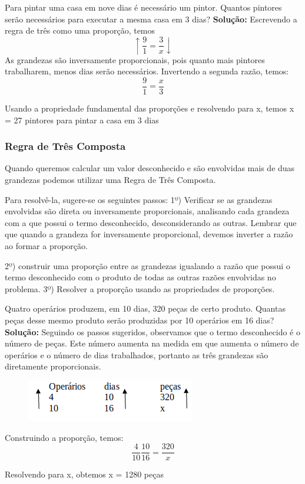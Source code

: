 \begin{texemplo}

	Para pintar uma casa em nove dias é necessário um pintor. Quantos pintores serão necessários para executar a mesma casa em 3 dias?
	\textbf{Solução:} Escrevendo a regra de três como uma proporção, temos 
	$$\uparrow \dfrac{9}{1} = \dfrac{3}{x} \downarrow$$
	As grandezas são inversamente proporcionais, pois quanto mais pintores trabalharem, menos dias serão necessários. Invertendo a segunda razão, temos:
	$$\dfrac{9}{1} = \dfrac{x}{3}$$ 
 
	Usando a propriedade fundamental das proporções e resolvendo para x, temos x = 27 pintores para pintar a casa em 3 dias \qedsymbol{}

\end{texemplo}

\subsubsection{Regra de Três Composta}
	Quando queremos calcular um valor desconhecido e são envolvidas mais de duas grandezas podemos utilizar uma Regra de Três Composta. 

	Para resolvê-la, sugere-se os seguintes passos:
	1º) Verificar se as grandezas envolvidas são direta ou inversamente proporcionais, analisando cada grandeza com a que possui o termo desconhecido, desconsiderando as outras. Lembrar que que quando a grandeza for inversamente proporcional, devemos inverter a razão ao formar a proporção.

	2º) construir uma proporção entre as grandezas igualando a razão que possui o termo desconhecido com o produto de todas as outras razões envolvidas no problema.
	3º) Resolver a proporção usando as propriedades de proporções.

\begin{texemplo}

	Quatro operários produzem, em 10 dias, 320 peças de certo produto. Quantas peças desse mesmo produto serão produzidas por 10 operários em 16 dias?
	\textbf{Solução:} Seguindo os passos sugeridos, observamos que o termo desconhecido é o número de peças. Este número aumenta na medida em que aumenta o número de operários e o número de dias trabalhados, portanto as três grandezas são diretamente proporcionais.

\begin{figure}[H]
	\begin{center}
		\includegraphics{capitulos/grandezas_proporcionais/media/image08.png}
	\end{center}
\end{figure}

Construindo a proporção, temos:
$$\dfrac{4}{10}\dfrac{10}{16}=\dfrac{320}{x}$$

Resolvendo para x, obtemos  x = 1280 peças \qedsymbol{}
\end{texemplo}

